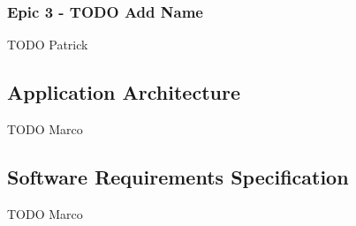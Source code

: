 \subsubsection{Epic 3 - TODO Add Name}
\label{sssec:epic3}

TODO Patrick

\subsection{Application Architecture}
\label{ssec:application_architecture}

TODO Marco

\subsection{Software Requirements Specification}
\label{ssec:software_requirements_specification}

TODO Marco